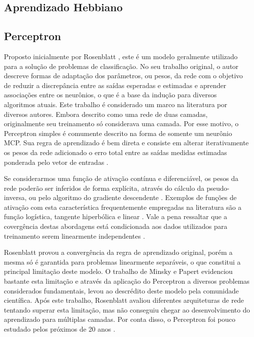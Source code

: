 \documentclass[conference]{IEEEtran}
\begin{document}
	\subsection{Aprendizado Hebbiano}
	

	\subsection{Perceptron}
	Proposto inicialmente por Rosenblatt \cite{rosenblatt1957perceptron}, este é um modelo geralmente utilizado para a solução de problemas de classificação. No seu trabalho original, o autor descreve formas de adaptação dos parâmetros, ou pesos, da rede com o objetivo de reduzir a discrepância entre as saídas esperadas e estimadas e aprender associações entre os neurônios, o que é a base da indução para diversos algoritmos atuais. Este trabalho é considerado um marco na literatura por diversos autores. Embora descrito como uma rede de duas camadas, originalmente seu treinamento só considerava uma camada. Por esse motivo, o Perceptron simples é comumente descrito na forma de somente um neurônio MCP. Sua regra de aprendizado é bem direta e consiste em alterar iterativamente os pesos da rede adicionado o erro total entre as saídas medidas estimadas ponderada pelo vetor de entradas \cite{haykin2007neural}. 
	
	Se considerarmos uma função de ativação contínua e diferenciável, os pesos da rede poderão ser inferidos de forma explícita, através do cálculo da pseudo-inversa, ou pelo algoritmo do gradiente descendente \cite{hertz1991introduction}. Exemplos de funções de ativação com esta característica frequentemente empregadas na literatura são a função logística, tangente hiperbólica e linear \cite{jain1996artificial}. Vale a pena ressaltar que a covergência destas abordagens está condicionada aos dados utilizados para treinamento serem linearmente independentes \cite{hertz1991introduction}.
	
	Rosenblatt provou a convergência da regra de aprendizado original, porém a mesma só é garantida para problemas linearmente separáveis, o que constitui a principal limitação deste modelo. O trabalho de Minsky e Papert \cite{minsky1969introduction} evidenciou bastante esta limitação e através da aplicação do Perceptron a diversos problemas considerados fundamentais, levou ao descrédito deste modelo pela comunidade científica. Após este trabalho, Rosenblatt avaliou diferentes arquiteturas de rede tentando superar esta limitação, mas não conseguiu chegar ao desenvolvimento do aprendizado para múltiplas camadas. Por conta disso, o Perceptron foi pouco estudado pelos próximos de 20 anos \cite{hertz1991introduction}.
	
\end{document}
